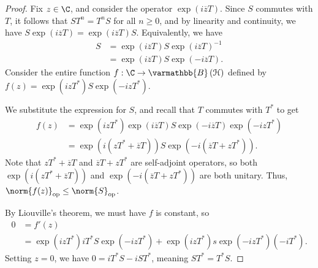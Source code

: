 \documentclass[10pt]{mypackage}
\renewcommand*{\mathbb}[1]{\varmathbb{#1}}
\newcommand{\B}{\mathbb{B}}
\begin{document}
\begin{proof}
  Fix $z\in \C$, and consider the operator $\exp\left(i\overline{z}T\right)$. Since $S$ commutes with $T$, it follows that $ST^{n} = T^{n}S$ for all $n\geq 0$, and by linearity and continuity, we have $S\exp\left(i\overline{z}T\right) = \exp\left(i\overline{z}T\right)S$. Equivalently, we have
  \begin{align*}
    S &= \exp\left(i\overline{z}T\right)S \exp\left(i\overline{z}T\right)^{-1}\\
      &= \exp\left(i\overline{z}T\right)S \exp\left(-i\overline{z}T\right).
  \end{align*}
  Consider the entire function $f: \C\rightarrow \B\left(\mathcal{H}\right)$ defined by $f\left(z\right) = \exp\left(izT^{\ast}\right)S\exp\left(-izT^{\ast}\right)$.\newline

  We substitute the expression for $S$, and recall that $T$ commutes with $T^{\ast}$ to get
  \begin{align*}
    f\left(z\right) &= \exp\left(izT^{\ast}\right)\exp\left(i\overline{z}T\right)S\exp\left(-i\overline{z}T\right)\exp\left(-izT^{\ast}\right)\\
                    &= \exp\left(i\left(zT^{\ast} + \overline{z}T\right)\right)S\exp\left(-i\left(\overline{z}T + zT^{\ast}\right)\right).
  \end{align*}
  Note that $zT^{\ast} + \overline{z}T$ and $\overline{z}T + zT^{\ast}$ are self-adjoint operators, so both $\exp\left(i\left(zT^{\ast} + \overline{z}T\right)\right)$ and $\exp\left(-i\left(\overline{z}T + zT^{\ast}\right)\right)$ are both unitary. Thus, $\norm{f(z)}_{\text{op}}\leq \norm{S}_{\text{op}}$.\newline

  By Liouville's theorem, we must have $f$ is constant, so
  \begin{align*}
    0 &= f'(z)\\
      &= \exp\left(izT^{\ast}\right)iT^{\ast}S\exp\left(-izT^{\ast}\right) + \exp\left(izT^{\ast}\right)s\exp\left(-izT^{\ast}\right)\left(-iT^{\ast}\right).
  \end{align*}
  Setting $z = 0$, we have $0 = iT^{\ast}S - iST^{\ast}$, meaning $ST^{\ast} = T^{\ast}S$.
\end{proof}
\end{document}
